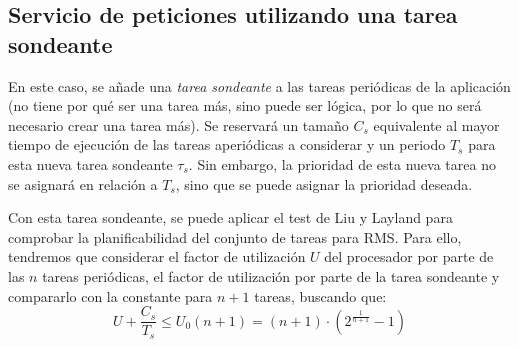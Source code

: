 \subsection{Servicio de peticiones utilizando una tarea sondeante}
En este caso, se añade una \textit{tarea sondeante} a las tareas periódicas de la aplicación (no tiene por qué ser una tarea más, sino puede ser lógica, por lo que no será necesario crear una tarea más). Se reservará un tamaño $C_s$ equivalente al mayor tiempo de ejecución de las tareas aperiódicas a considerar y un periodo $T_s$ para esta nueva tarea sondeante $\tau_s$. Sin embargo, la prioridad de esta nueva tarea no se asignará en relación a $T_s$, sino que se puede asignar la prioridad deseada.

Con esta tarea sondeante, se puede aplicar el test de Liu y Layland para comprobar la planificabilidad del conjunto de tareas para RMS\@. Para ello, tendremos que considerar el factor de utilización $U$ del procesador por parte de las $n$ tareas periódicas, el factor de utilización por parte de la tarea sondeante y compararlo con la constante para $n+1$ tareas, buscando que:
\begin{equation*}
   U + \dfrac{C_s}{T_s} \leq U_0(n+1) = (n+1)\cdot \left(2^{\frac{1}{n+1}}-1\right)
\end{equation*}

